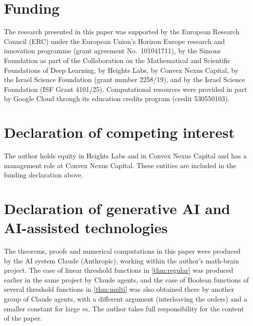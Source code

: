 \documentclass[11pt]{amsart}
\theoremstyle{definition}
\theoremstyle{remark}
\begin{document}
\section*{Funding}
The research presented in this paper was supported by the European Research Council (ERC) under the European
Union's Horizon Europe research and innovation programme (grant agreement No.~101041711), by the Simons Foundation
as part of the Collaboration on the Mathematical and Scientific Foundations of Deep Learning, by Heights Labs, by
Convex Nexus Capital, by the Israel Science Foundation (grant number 2258/19), and by the Israel Science Foundation
(ISF Grant 4101/25). Computational resources were provided in part by Google Cloud through its education credits
program (credit 530550103).

\section*{Declaration of competing interest}
The author holds equity in Heights Labs and in Convex Nexus Capital and has a management role at Convex Nexus
Capital. These entities are included in the funding declaration above.

\section*{Declaration of generative AI and AI-assisted technologies}
The theorems, proofs and numerical computations in this paper were produced by the AI system Claude (Anthropic),
working within the author's math-brain project. The case of linear threshold functions in \cref{thm:regular} was
produced earlier in the same project by Claude agents, and the case of Boolean functions of several threshold
functions in \cref{thm:multi} was also obtained there by another group of Claude agents, with a different argument
(interleaving the orders) and a smaller constant for large $m$. The author takes full responsibility for the content
of the paper.
\end{document}
